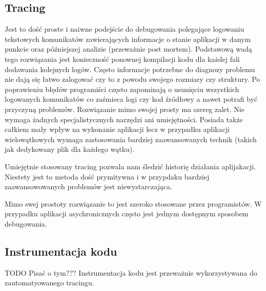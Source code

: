 \subsection{Tracing}

Jest to dość proste i naiwne podejście do debugowania polegające logowaniu tekstowych komunikatów zawierających informacje o stanie aplikacji w danym punkcie oraz późniejszej analizie (przeważnie post mortem). Podstawową wadą tego rozwiązania jest konieczność ponownej kompilacji kodu dla każdej fali dodawania kolejnych logów. Często informacje potrzebne do diagnozy problemu nie dają się łatwo zalogować czy to z powodu swojego rozmiary czy struktury. Po poprawieniu błędów programiści często zapominają o usunięciu wszystkich logowanych komunikatów co zaśmieca logi czy kod źródłowy a nawet potrafi być przyczyną problemów.
Rozwiązanie mimo swojej prosty ma szereg zalet. Nie wymaga żadnych specjalistycznych narzędzi ani umiejętności. Posiada także całkiem mały wpływ na wykonanie aplikacji lecz w przypadku aplikacji wielowątkowych wymaga zastosowania bardziej zaawansowanych technik (takich jak dedykowany plik dla każdego wątku).

Umiejętnie stosowany tracing pozwala nam śledzić historię działania aplijakacji. Niestety jest to metoda dość prymitywna i w przypdaku bardziej zaawansowowanych problemów jest niewystarczająca.
 
Mimo swej prostoty rozwiązanie to jest szeroko stosowane przez programistów. W przypadku aplikacji asychronicznych często jest jednym dostępnym sposobem debugowania. 

\subsection{Instrumentacja kodu}

TODO Pisać o tym???
Instrumentacja kodu jest przeważnie wykorzystywana do zautomatyowanego tracingu.

